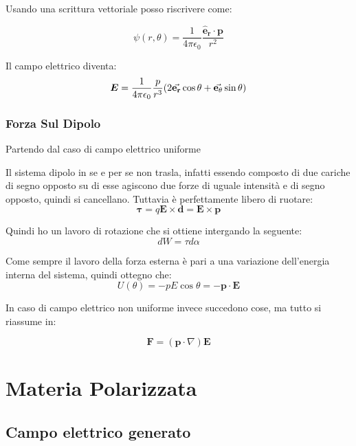 \documentclass[a4paper]{scrarticle}
\begin{document}
Usando una scrittura vettoriale posso riscrivere come:

\begin{equation}
    \psi(r, \theta) = \frac{1}{4 \pi \epsilon_0} \frac{\bm{\hat e_r} \cdot \bm p}{r^2}
\end{equation}

Il campo elettrico diventa:
\begin{equation}
    \bm E = \frac{1}{4\pi\epsilon_0} \frac{p}{r^3} (2 \va{ e_r}\cos \theta + \va{ e_\theta} \sin\theta )
\end{equation}

\subsubsection*{Forza Sul Dipolo}

Partendo dal caso di campo elettrico uniforme

Il sistema dipolo in se e per se non trasla, infatti essendo composto di due cariche di segno opposto su di esse agiscono due forze di uguale intensità e di segno opposto, quindi si cancellano. Tuttavia è perfettamente libero di ruotare:
\begin{equation}
    \bm \tau = q \bm E \times \bm d = \bm E \times \bm p
\end{equation}

Quindi ho un lavoro di rotazione che si ottiene intergando la seguente:
\begin{equation*}
    dW = \tau d\alpha
\end{equation*}

Come sempre il lavoro della forza esterna è pari a una variazione dell'energia interna del sistema, quindi ottegno che:
\begin{equation*}
    U(\theta) = -pE\cos \theta = - \bm p \cdot \bm E
\end{equation*}

In caso di campo elettrico non uniforme invece succedono cose, ma tutto si riassume in:

\begin{equation*}
    \bm F = (\bm p \cdot \nabla)\bm E
\end{equation*}

\section{Materia Polarizzata}

\subsection{Campo elettrico generato}
\end{document}
